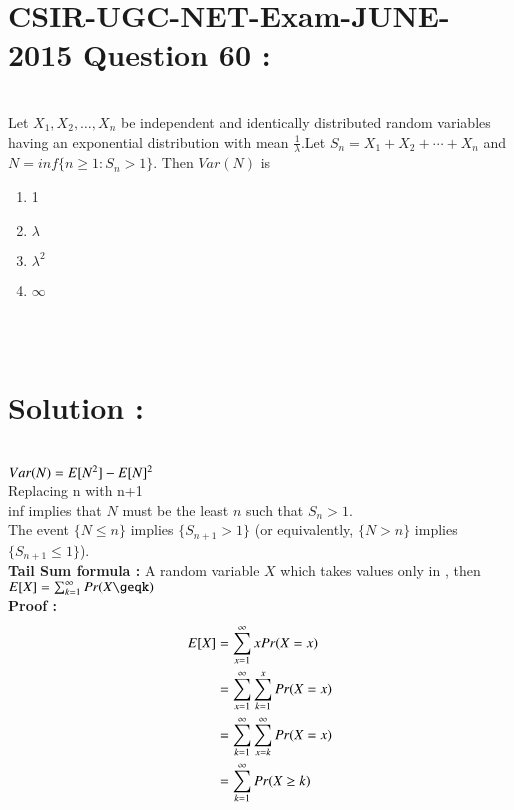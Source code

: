\documentclass[journal,12pt,twocolumn]{IEEEtran}
\begin{document}
\section{CSIR-UGC-NET-Exam-JUNE-2015 Question 60 :}\\
Let $X_1, X_2, \dots, X_n$ be independent and identically distributed random variables having an exponential distribution with mean $\frac{1}{\lambda}$.Let $S_n = X_1 + X_2 + \cdots + X_n$ and $N = inf \{n \geq 1: S_n > 1\}$. Then $Var(N)$ is\\
\begin{enumerate}
    \item 1
    \item $\lambda$
    \item $\lambda^2$
    \item $\infty$
\end{enumerate}
\\ \\
\section{Solution :}\\
$Var(N) = E[ N^2 ] - E[ N ]^2$\\
Replacing n with n+1\\
inf implies that $N$ must be the least $n$ such that $S_n > 1$.\\
The event $\{N \leq n\}$ implies $\{S_{n+1} > 1\}$ (or equivalently, $\{N > n\}$ implies $\{S_{n+1} \leq 1\}$).\\
\textbf{Tail Sum formula : } A random variable $X$ which takes values only in , then $\mean{X} = \sum _{k=1} ^\infty Pr(X\geqk)$\\
\textbf{Proof : }\\
\begin{align}
    E[ X ] &= \sum _{x = 1} ^\infty x Pr(X=x)\\
    &= \sum _{x = 1} ^\infty \sum _{k=1} ^x Pr(X=x)\\
    &= \sum _{k = 1} ^\infty \sum _{x = k} ^\infty Pr(X=x)\\
    &= \sum _{k = 1} ^\infty Pr(X\geq k)
\end{align}
\end{document}
